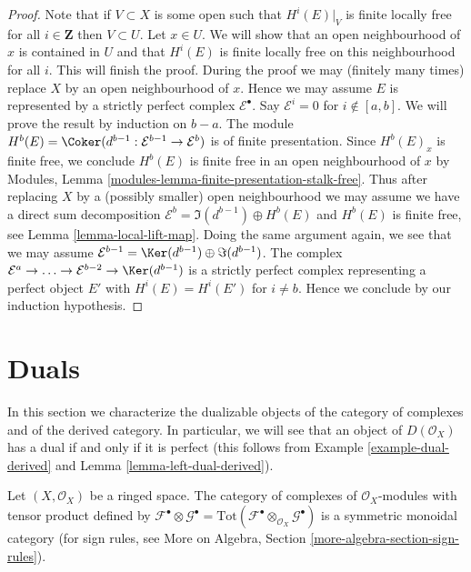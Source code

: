 \begin{proof}
Note that if $V \subset X$ is some open such that $H^i(E)|_V$
is finite locally free for all $i \in \mathbf{Z}$ then $V \subset U$. 
Let $x \in U$. We will show that an open neighbourhood of $x$
is contained in $U$ and that $H^i(E)$ is finite locally free
on this neighbourhood for all $i$. This will finish the proof.
During the proof we may (finitely many times) replace
$X$ by an open neighbourhood of $x$.
Hence we may assume $E$ is represented
by a strictly perfect complex $\mathcal{E}^\bullet$. Say
$\mathcal{E}^i = 0$ for $i \not \in [a, b]$. We will
prove the result by induction on $b - a$. The module
$H^b(E) = \Coker(d^{b - 1} : \mathcal{E}^{b - 1} \to \mathcal{E}^b)$
is of finite presentation. Since $H^b(E)_x$ is finite free,
we conclude $H^b(E)$ is finite free in an open neighbourhood of $x$ by
Modules, Lemma \ref{modules-lemma-finite-presentation-stalk-free}.
Thus after replacing $X$ by a (possibly smaller) open
neighbourhood we may assume we have a direct sum decomposition
$\mathcal{E}^b = \Im(d^{b - 1}) \oplus H^b(E)$ and
$H^b(E)$ is finite free, see Lemma \ref{lemma-local-lift-map}.
Doing the same argument again, we see that we may
assume $\mathcal{E}^{b - 1} = \Ker(d^{b - 1}) \oplus \Im(d^{b - 1})$.
The complex
$\mathcal{E}^a \to \ldots \to \mathcal{E}^{b - 2} \to \Ker(d^{b - 1})$
is a strictly perfect complex representing a perfect
object $E'$ with $H^i(E) = H^i(E')$ for $i \not = b$.
Hence we conclude by our induction hypothesis.
\end{proof}






\section{Duals}
\label{section-duals}

\noindent
In this section we characterize the dualizable objects of
the category of complexes and of the derived category.
In particular, we will see that an object of $D(\mathcal{O}_X)$
has a dual if and only if it is perfect (this follows from
Example \ref{example-dual-derived} and
Lemma \ref{lemma-left-dual-derived}).

\begin{lemma}
\label{lemma-symmetric-monoidal-cat-complexes}
Let $(X, \mathcal{O}_X)$ be a ringed space. The category of complexes
of $\mathcal{O}_X$-modules with tensor product defined by
$\mathcal{F}^\bullet \otimes \mathcal{G}^\bullet =
\text{Tot}(\mathcal{F}^\bullet \otimes_{\mathcal{O}_X} \mathcal{G}^\bullet)$
is a symmetric monoidal category (for sign rules, see
More on Algebra, Section \ref{more-algebra-section-sign-rules}).
\end{lemma}

